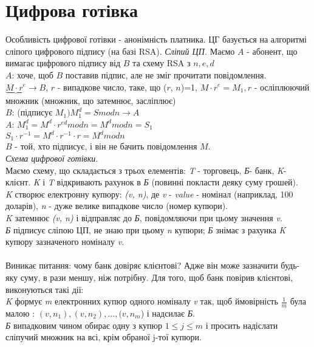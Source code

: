\section{Цифрова готівка}
Особливість цифрової готівки - анонімність платника. ЦГ базується на алгоритмі сліпого цифрового підпису (на базі RSA).
\emph{Сліпий ЦП.}
Маємо $A$ - абонент, що вимагає цифрового підпису від $B$ та схему RSA з $n, e, d $\\
$A$: хоче, щоб $B$ поставив підпис, але не зміг прочитати повідомлення.\\
$ \underbrace{M \cdot r^{e}} \rightarrow B$, $r$ - випадкове число, таке, що ($r$, $n$)=1, $M \cdot r^{e} = M_{1}, r$ - осліплюючий множник (множник, що затемнює, засліплює)\\
$B$: (підписує $M_{1}) M_{1}^{d}=S mod n \longrightarrow A$\\
$A$: $M_{1}^{d} = M^{d} \cdot r^{ed} mod n = M^{d} mod n = S_{1}$\\
$S_{1} \cdot r^{-1} = M^{d} \cdot r^{-1} \cdot r = M^{d} mod n$\\
$B$ - той, хто підписує, і він не бачить повідомлення $M$.\\
\emph{Схема цифрової готівки.}\\
Маємо схему, що складається з трьох елементів: \textit{T} - торговець, \textit{Б}- банк, \textit{K}- клієнт. \textit{K} і \textit{T} відкривають рахунок в \textit{Б} (повинні покласти деяку суму грошей). \\
\textit{K} створює електронну купюру: \textit{(v, n)}, де \textit{v} - \emph{value} - номінал (наприклад, 100 доларів), \textit{n} - дуже велике випадкове число (номер купюри).\\
\textit{K} затемнює \textit{(v, n)} і відправляє до \textit{Б}, повідомляючи при цьому значення \textit{v}.\\
\textit{Б} підписує сліпою ЦП, не знаю при цьому \textit{n} купюри; \textit{Б} знімає з рахунка \textit{K} купюру зазначеного номіналу \textit{v}.\\
\\
Виникає питання: чому банк довіряє клієнтові? Адже він може зазначити будь-яку суму, в рази меншу, ніж потрібну. Для того, щоб банк повірив клієнтові, виконуються такі дії:\\
\textit{K} формує \textit{m} електронних купюр одного номіналу \textit{v} так, щоб ймовірність $\frac{1}{m}$ була малою : $(v, n_{1}), (v, n_{2}), ... , (v, n_{m}$) і надсилає \textit{Б}.\\
\textit{Б} випадковим чином обирає одну з купюр $1\leq j \leq m$ і просить надіслати сліпучий множник на всі, крім обраної j-тої купюри. \\
